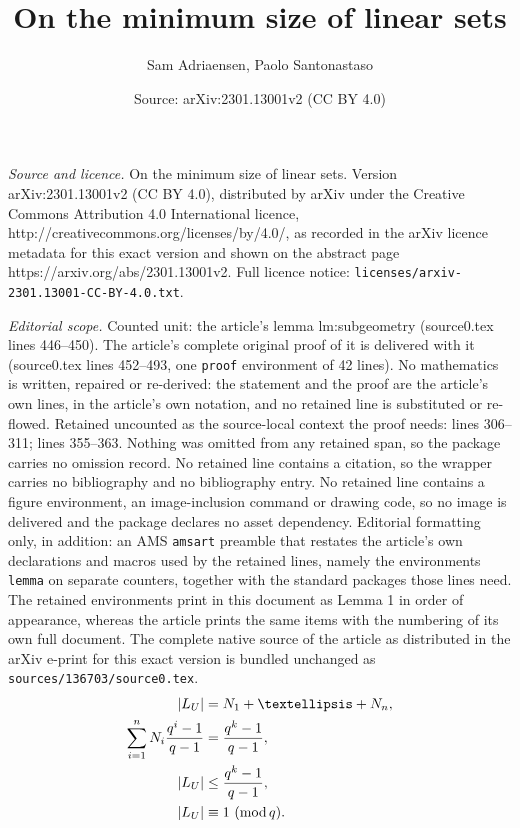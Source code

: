 \documentclass[10pt,a4paper]{amsart}
\title{On the minimum size of linear sets}
\author{Sam Adriaensen, Paolo Santonastaso}
\date{Source: arXiv:2301.13001v2 (CC BY 4.0)}
\renewcommand{\mod}{\hbox{{\rm mod}\,}}
\begin{document}
\maketitle

\noindent\emph{Source and licence.} On the minimum size of linear sets. Version arXiv:2301.13001v2 (CC BY 4.0), distributed by arXiv under the Creative Commons Attribution 4.0 International licence, http://creativecommons.org/licenses/by/4.0/, as recorded in the arXiv licence metadata for this exact version and shown on the abstract page https://arxiv.org/abs/2301.13001v2. Full licence notice: \texttt{licenses/arxiv-2301.13001-CC-BY-4.0.txt}.\par\smallskip

\noindent\textit{Editorial scope.} Counted unit: the article's lemma lm:subgeometry (source0.tex lines 446--450). The article's complete original proof of it is delivered with it (source0.tex lines 452--493, one \texttt{proof} environment of 42 lines). No mathematics is written, repaired or re-derived: the statement and the proof are the article's own lines, in the article's own notation, and no retained line is substituted or re-flowed.  Retained uncounted as the source-local context the proof needs: lines 306--311; lines 355--363.  Nothing was omitted from any retained span, so the package carries no omission record.  No retained line contains a citation, so the wrapper carries no bibliography and no bibliography entry.  No retained line contains a figure environment, an image-inclusion command or drawing code, so no image is delivered and the package declares no asset dependency.  Editorial formatting only, in addition: an AMS \texttt{amsart} preamble that restates the article's own declarations and macros used by the retained lines, namely the environments \texttt{lemma} on separate counters, together with the standard packages those lines need.  The retained environments print in this document as Lemma 1 in order of appearance, whereas the article prints the same items with the numbering of its own full document.  The complete native source of the article as distributed in the arXiv e-print for this exact version is bundled unchanged as \texttt{sources/136703/source0.tex}.
\begin{align}
    |L_U| &=N_1+\ldots+N_n, \label{eq:pesicard} \\
    \sum_{i=1}^n N_i \frac{q^i-1}{q-1}&=\frac{q^k-1}{q-1}, \label{eq:pesivett} \\
    |L_U| &\leq \frac{q^k-1}{q-1}, \label{eq:card} \\
    |L_U| &\equiv 1 \ (\mod q). \label{eq:modqsize}
\end{align}
\end{document}
